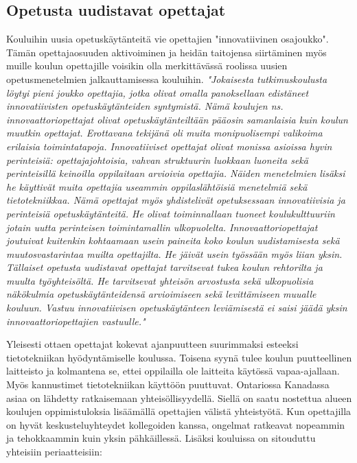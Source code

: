 \documentclass[utf8,bachelor]{gradu3}
\begin{document}
\subsection{Opetusta uudistavat opettajat}
Kouluihin uusia opetuskäytänteitä vie opettajien "innovatiivinen osajoukko". Tämän opettajaosuuden aktivoiminen ja heidän taitojensa siirtäminen myös muille koulun opettajille voisikin olla merkittävässä roolissa uusien opetusmenetelmien jalkauttamisessa kouluihin.
\textit{"Jokaisesta tutkimuskoulusta löytyi pieni joukko opettajia, jotka olivat omalla panoksellaan edistäneet innovatiivisten opetuskäytänteiden syntymistä. Nämä koulujen ns. innovaattoriopettajat olivat opetuskäytänteiltään pääosin samanlaisia kuin koulun muutkin opettajat. Erottavana tekijänä oli muita monipuolisempi valikoima erilaisia toimintatapoja. Innovatiiviset opettajat olivat monissa asioissa hyvin perinteisiä: opettajajohtoisia, vahvan struktuurin luokkaan luoneita sekä perinteisillä keinoilla oppilaitaan arvioivia opettajia. Näiden menetelmien lisäksi he käyttivät muita opettajia useammin oppilaslähtöisiä menetelmiä sekä tietotekniikkaa. Nämä opettajat myös yhdistelivät opetuksessaan innovatiivisia ja perinteisiä opetuskäytänteitä. He olivat toiminnallaan tuoneet koulukulttuuriin jotain uutta perinteisen toimintamallin ulkopuolelta. Innovaattoriopettajat joutuivat kuitenkin kohtaamaan usein paineita koko koulun uudistamisesta sekä muutosvastarintaa muilta opettajilta. He jäivät usein työssään myös liian yksin. Tällaiset opetusta uudistavat opettajat tarvitsevat tukea koulun rehtorilta ja muulta työyhteisöltä. He tarvitsevat yhteisön arvostusta sekä ulkopuolisia näkökulmia opetuskäytänteidensä arvioimiseen sekä levittämiseen muualle kouluun. Vastuu innovatiivisen opetuskäytänteen leviämisestä ei saisi jäädä yksin innovaattoriopettajien vastuulle."} \parencite[][]{koulunArki}

Yleisesti ottaen opettajat kokevat ajanpuutteen suurimmaksi esteeksi tietotekniikan hyödyntämiselle koulussa. Toisena syynä tulee koulun puutteellinen laitteisto ja kolmantena se, ettei oppilailla ole laitteita käytössä vapaa-ajallaan. \parencite[][]{sites} Myös kannustimet tietotekniikan käyttöön puuttuvat. \parencite[][]{itviikkoWilen} Ontariossa Kanadassa asiaa on lähdetty ratkaisemaan yhteisöllisyydellä.
Siellä on saatu nostettua alueen koulujen oppimistuloksia lisäämällä opettajien välistä yhteistyötä. Kun opettajilla on hyvät keskusteluyhteydet kollegoiden kanssa, ongelmat ratkeavat nopeammin ja tehokkaammin kuin yksin pähkäillessä. Lisäksi kouluissa on sitouduttu yhteisiin periaatteisiin:
\end{document}

